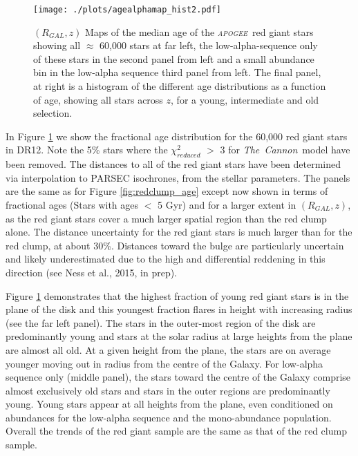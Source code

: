 \documentclass[12pt, preprint]{aastex}
\newcommand{\project}[1]{\textsl{#1}}
\newcommand{\tc}{\project{The~Cannon}}
\newcommand{\apogee}{\project{\textsc{apogee}}}
\begin{document}
\begin{figure}[p]
\centering
              \texttt{[image: ./plots/agealphamap\_hist2.pdf]}
    \caption{$(R_{GAL},z)$ Maps of the median age of the \apogee\  red giant stars showing all $\approx$ 60,000 stars at far left, the low-alpha-sequence only of these stars in the second panel from left and a small abundance bin in the low-alpha sequence third panel from left. The final panel, at right is a histogram of the different age distributions as a function of age, showing all stars across $z$, for a young, intermediate and old selection.  }
\label{fig:allage}
\end{figure}

In Figure \ref{fig:allage} we show the fractional age distribution for the 60,000 red giant stars in DR12. Note the 5\% stars where the $\chi_{reduced}^2$ $>$ 3 for \tc\ model have been removed. The distances to all of the red giant stars have been determined via interpolation to PARSEC isochrones, from the stellar parameters. The panels are the same as for Figure \ref{fig:redclump_age} except now shown in terms of fractional ages (Stars with ages $<$ 5 Gyr) and for a larger extent in $(R_{GAL},z)$, as the red giant stars cover a much larger spatial region than the red clump alone. The distance uncertainty for the red giant stars is much larger than for the red clump, at about 30\%. Distances toward the bulge are particularly uncertain and likely underestimated due to the high and differential reddening in this direction (see Ness et al., 2015, in prep).  

Figure \ref{fig:allage} demonstrates that the highest fraction of young red giant stars is in the plane of the disk and this youngest fraction flares in height with increasing radius (see the far left panel).  The stars in the outer-most region of the disk are predominantly young and stars at the solar radius at large heights from the plane are almost all old. At a given height from the plane, the stars are on average younger moving out in radius from the centre of the Galaxy. For low-alpha sequence only (middle panel), the stars toward the centre of the Galaxy comprise almost exclusively old stars and stars in the outer regions are predominantly young.  Young stars appear at all heights from the plane, even conditioned on abundances for the low-alpha sequence and the mono-abundance population. Overall the trends of the red giant sample are the same as that of the red clump sample. 
\end{document}
